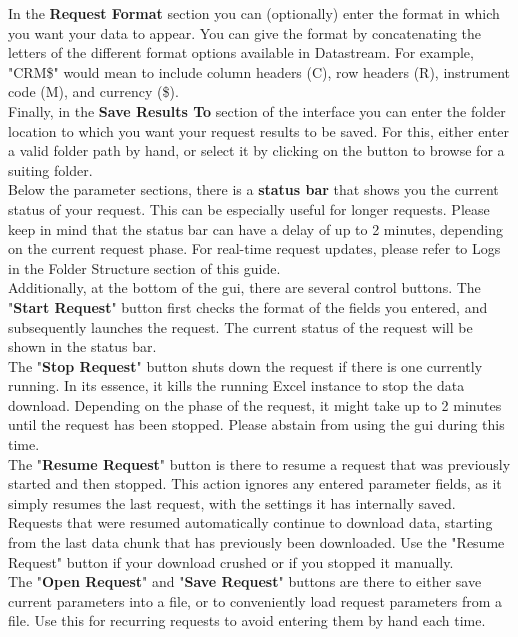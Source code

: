 In the \textbf{Request Format} section you can (optionally) enter the format in which you want your data to appear. You can give the format by concatenating the letters of the different format options available in Datastream. For example, "CRM\$" would mean to include column headers (C), row headers (R), instrument code (M), and currency (\$). \\

Finally, in the \textbf{Save Results To} section of the interface you can enter the folder location to which you want your request results to be saved. For this, either enter a valid folder path by hand, or select it by clicking on the button to browse for a suiting folder. \\

Below the parameter sections, there is a \textbf{status bar} that shows you the current status of your request. This can be especially useful for longer requests. Please keep in mind that the status bar can have a delay of up to 2 minutes, depending on the current request phase. For real-time request updates, please refer to Logs in the Folder Structure section of this guide. \\

Additionally, at the bottom of the gui, there are several control buttons. The "\textbf{Start Request}" button first checks the format of the fields you entered, and subsequently launches the request. The current status of the request will be shown in the status bar. \\


The "\textbf{Stop Request}" button shuts down the request if there is one currently running. In its essence, it kills the running Excel instance to stop the data download. Depending on the phase of the request, it might take up to 2 minutes until the request has been stopped. Please abstain from using the gui during this time. \\


The "\textbf{Resume Request}" button is there to resume a request that was previously started and then stopped. This action ignores any entered parameter fields, as it simply resumes the last request, with the settings it has internally saved. Requests that were resumed automatically continue to download data, starting from the last data chunk that has previously been downloaded. Use the "Resume Request" button if your download crushed or if you stopped it manually. \\


The "\textbf{Open Request}" and "\textbf{Save Request}" buttons are there to either save current parameters into a file, or to conveniently load request parameters from a file. Use this for recurring requests to avoid entering them by hand each time. \\


